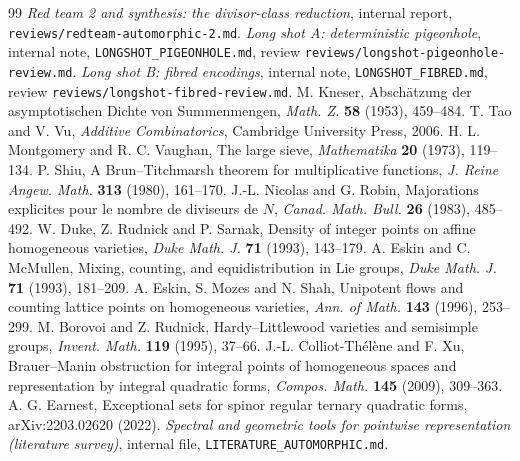 \documentclass[10pt,reqno]{amsart}
\theoremstyle{definition}
\numberwithin{equation}{section}
\begin{document}
\begin{thebibliography}{99}
 \emph{Red team 2 and synthesis: the divisor-class reduction}, internal report, \texttt{reviews/redteam-automorphic-2.md}.
 \emph{Long shot A: deterministic pigeonhole}, internal note, \texttt{LONGSHOT\_PIGEONHOLE.md}, review \texttt{reviews/longshot-pigeonhole-review.md}.
 \emph{Long shot B: fibred encodings}, internal note, \texttt{LONGSHOT\_FIBRED.md}, review \texttt{reviews/longshot-fibred-review.md}.
 M. Kneser, Absch\"atzung der asymptotischen Dichte von Summenmengen, \emph{Math. Z.} \textbf{58} (1953), 459--484.
 T. Tao and V. Vu, \emph{Additive Combinatorics}, Cambridge University Press, 2006.
 H. L. Montgomery and R. C. Vaughan, The large sieve, \emph{Mathematika} \textbf{20} (1973), 119--134.
 P. Shiu, A Brun--Titchmarsh theorem for multiplicative functions, \emph{J. Reine Angew. Math.} \textbf{313} (1980), 161--170.
 J.-L. Nicolas and G. Robin, Majorations explicites pour le nombre de diviseurs de $N$, \emph{Canad. Math. Bull.} \textbf{26} (1983), 485--492.
 W. Duke, Z. Rudnick and P. Sarnak, Density of integer points on affine homogeneous varieties, \emph{Duke Math. J.} \textbf{71} (1993), 143--179.
 A. Eskin and C. McMullen, Mixing, counting, and equidistribution in Lie groups, \emph{Duke Math. J.} \textbf{71} (1993), 181--209.
 A. Eskin, S. Mozes and N. Shah, Unipotent flows and counting lattice points on homogeneous varieties, \emph{Ann. of Math.} \textbf{143} (1996), 253--299.
 M. Borovoi and Z. Rudnick, Hardy--Littlewood varieties and semisimple groups, \emph{Invent. Math.} \textbf{119} (1995), 37--66.
 J.-L. Colliot-Th\'el\`ene and F. Xu, Brauer--Manin obstruction for integral points of homogeneous spaces and representation by integral quadratic forms, \emph{Compos. Math.} \textbf{145} (2009), 309--363.
 A. G. Earnest, Exceptional sets for spinor regular ternary quadratic forms, arXiv:2203.02620 (2022).
\enlargethispage{3\baselineskip}
 \emph{Spectral and geometric tools for pointwise representation (literature survey)}, internal file, \texttt{LITERATURE\_AUTOMORPHIC.md}.
\end{thebibliography}
\end{document}
